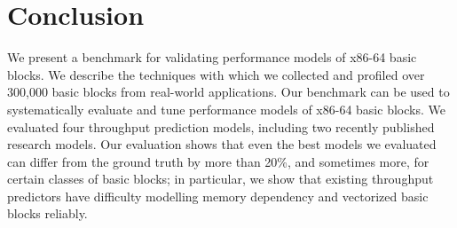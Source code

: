 \section{Conclusion}
We present a benchmark for validating performance models of x86-64 basic blocks.
We describe the techniques with which we collected
and profiled over 300,000 basic blocks from real-world applications.
Our benchmark can be used to systematically evaluate and tune performance models
of x86-64 basic blocks.
We evaluated four throughput prediction models, including two recently
published research models.
Our evaluation shows that even the best models we evaluated can differ from
the ground truth by more than 20\%, and sometimes more, 
for certain classes of basic blocks;
in particular, we show that existing throughput predictors have difficulty 
modelling memory dependency and vectorized basic blocks reliably.